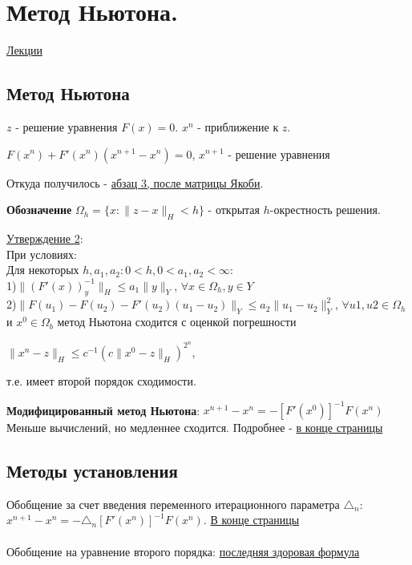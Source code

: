 \documentclass[specialist, subf, href, colorlinks=true, 12pt, times, mtpro, final]{disser}
\theoremstyle{definition}
\begin{document}
\section {Метод Ньютона.}
	\hyperlink {lects.83}{Лекции}\\

\subsection {Метод Ньютона}
$z$ - решение уравнения $F(x) = 0$. $x^n$ - приближение к $z$.
\begin{center}
$F(x^n) + F'(x^n)(x^{n+1} - x^n) = 0$, $x^{n+1}$ - решение уравнения
\end{center}
Откуда получилось - \hyperlink {lects.83}{абзац 3, после матрицы Якоби}.

\textbf{Обозначение} $\Omega_h = \{x: \|z-x\|_H < h\}$ - открытая $h$-окрестность решения.

\hyperlink {lects.84}{Утверждение 2}:\\
При условиях:\\
Для некоторых $h,a_1,a_2: 0 <h, 0<a_1,a_2<\infty$:\\
1)$\|(F'(x))^{-1}_y\|_H \leq a_1\|y\|_Y$, $\forall x \in \Omega_h, y \in Y$\\
2)$\|F(u_1)-F(u_2) - F'(u_2)(u_1-u_2)\|_Y \leq a_2\|u_1-u_2\|^2_Y$, $\forall u1,u2 \in \Omega_h$
\\ и $x^0 \in \Omega_b$ метод Ньютона сходится с оценкой погрешности 
\begin{center}
$\|x^n-z\|_H \leq c^{-1} (c\| x^0 - z\|_H)^{2^n}$, 
\end{center} т.е. имеет второй порядок сходимости.

\textbf{Модифицированный метод Ньютона}: 
$x^{n+1} - x^n = -[F'(x^0)]^{-1}F(x^n)$ \\
Меньше вычислений, но медленнее сходится. Подробнее - \hyperlink {lects.84}{в конце страницы}

\subsection {Методы установления}

Обобщение за счет введения переменного итерационного параметра $\triangle_n$: $x^{n+1} - x^n= -\triangle_n [F'(x^n)]^{-1}F(x^n)$. \hyperlink {lects.85}{В конце страницы}
\\
\\
Обобщение на уравнение второго порядка: \hyperlink {lects.86}{последняя здоровая формула}
\end{document}
